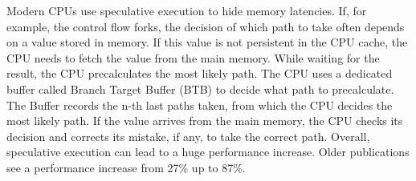 Modern CPUs use speculative execution to hide memory latencies. If, for example,
the control flow forks, the decision of which path to take often depends on a
value stored in memory. If this value is not persistent in the CPU cache, the
CPU needs to fetch the value from the main memory. While waiting for the result,
the CPU precalculates the most likely path. The CPU uses a dedicated buffer
called Branch Target Buffer (BTB) to decide what path to precalculate. The
Buffer records the n-th last paths taken, from which the CPU decides the most
likely path. If the value arrives from the main memory, the CPU checks its
decision and corrects its mistake, if any, to take the correct path. Overall,
speculative execution can lead to a huge performance increase. Older
publications see a performance increase from 27\% up to
87\%.\cite{espasa1997out, mock2005empirical}\\

